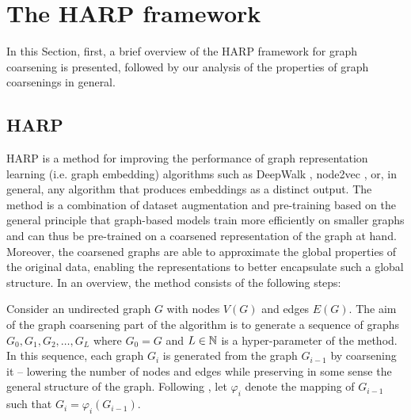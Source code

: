 \section{The HARP framework}\label{sec:harp-framework}

In this Section, first, a brief overview of the HARP framework for graph coarsening \cite{chen_harp_2018} is presented, followed by our analysis of the properties of graph coarsenings in general.

\subsection{HARP}\label{sec:harp}
HARP is a method for improving the performance of graph representation learning (i.e. graph embedding) algorithms such as DeepWalk \cite{perozzi_deepwalk_2014}, node2vec \cite{grover_node2vec_2016}, or, in general, any algorithm that produces embeddings as a distinct output. The method is a combination of dataset augmentation and pre-training based on the general principle that graph-based models train more efficiently on smaller graphs and can thus be pre-trained on a coarsened representation of the graph at hand. Moreover, the coarsened graphs are able to approximate the global properties of the original data, enabling the representations to better encapsulate such a global structure. In an overview, the method consists of the following steps:

Consider an undirected graph \( G \) with nodes \( V \left( G \right) \) and edges \( E \left( G \right) \). The aim of the graph coarsening part of the algorithm is to generate a sequence of graphs \( G_0, G_1, G_2, \dots, G_L \) where \( G_0 = G \) and \( L \in \mathbb{N} \) is a hyper-parameter of the method. In this sequence, each graph \( G_i \) is generated from the graph \( G_{i - 1} \) by coarsening it -- lowering the number of nodes and edges while preserving in some sense the general structure of the graph. Following \cite{chen_harp_2018}, let \( \varphi_i \) denote the mapping of \( G_{i - 1} \) such that \( G_i = \varphi_i \left( G_{i - 1} \right) \).

